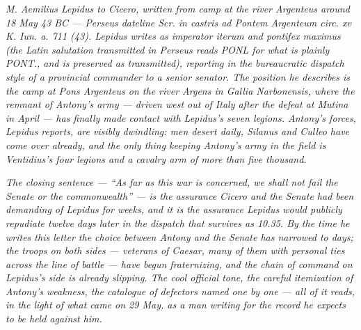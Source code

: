 
\textit{M. Aemilius Lepidus to Cicero, written from camp
at the river Argenteus around 18 May 43 BC --- Perseus
dateline \textit{Scr. in castris ad Pontem Argenteum
circ. xv K. Iun. a. 711 (43)}. Lepidus writes as
\textit{imperator iterum} and \textit{pontifex maximus}
(the Latin salutation transmitted in Perseus reads PONL
for what is plainly PONT., and is preserved as
transmitted), reporting in the bureaucratic dispatch
style of a provincial commander to a senior senator. The
position he describes is the camp at Pons Argenteus on
the river Argens in Gallia Narbonensis, where the
remnant of Antony's army --- driven west out of Italy
after the defeat at Mutina in April --- has finally
made contact with Lepidus's seven legions. Antony's
forces, Lepidus reports, are visibly dwindling: men
desert daily, Silanus and Culleo have come over
already, and the only thing keeping Antony's army in
the field is Ventidius's four legions and a cavalry
arm of more than five thousand.}

\textit{The closing sentence --- ``As far as this war
is concerned, we shall not fail the Senate or the
commonwealth'' --- is the assurance Cicero and the
Senate had been demanding of Lepidus for weeks, and it
is the assurance Lepidus would publicly repudiate
twelve days later in the dispatch that survives as
10.35. By the time he writes this letter the choice
between Antony and the Senate has narrowed to days;
the troops on both sides --- veterans of Caesar, many
of them with personal ties across the line of battle
--- have begun fraternizing, and the chain of command
on Lepidus's side is already slipping. The cool
official tone, the careful itemization of Antony's
weakness, the catalogue of defectors named one by one
--- all of it reads, in the light of what came on 29
May, as a man writing for the record he expects to be
held against him.}
